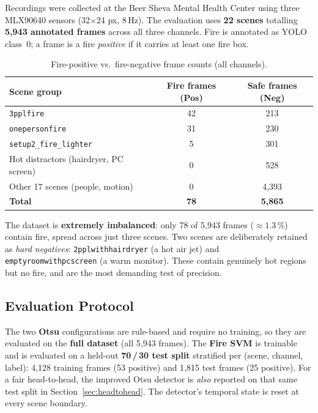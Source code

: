 \documentclass[11pt, a4paper]{article}
\begin{document}
Recordings were collected at the Beer Sheva Mental Health Center using three MLX90640
sensors (32$\times$24 px, 8\,Hz).  The evaluation uses \textbf{22 scenes} totalling
\textbf{5{,}943 annotated frames} across all three channels.  Fire is annotated as
YOLO class~0; a frame is a fire \emph{positive} if it carries at least one fire box.

\begin{table}[H]
\centering
\caption{Fire-positive vs.\ fire-negative frame counts (all channels).}
\renewcommand{\arraystretch}{1.3}
\begin{tabular}{lcc}
\toprule
\textbf{Scene group} & \textbf{Fire frames (Pos)} & \textbf{Safe frames (Neg)} \\
\midrule
\texttt{3pplfire}                 & 42 & 213 \\
\texttt{onepersonfire}            & 31 & 230 \\
\texttt{setup2\_fire\_lighter}    &  5 & 301 \\
\addlinespace
Hot distractors (hairdryer, PC screen) & 0 & 528 \\
Other 17 scenes (people, motion)       & 0 & 4{,}393 \\
\midrule
\textbf{Total} & \textbf{78} & \textbf{5{,}865} \\
\bottomrule
\end{tabular}
\label{tab:counts}
\end{table}

The dataset is \textbf{extremely imbalanced}: only 78 of 5{,}943 frames
($\approx 1.3\,\%$) contain fire, spread across just three scenes.  Two scenes are
deliberately retained as \emph{hard negatives}: \texttt{2pplwithhairdryer} (a hot air
jet) and \texttt{emptyroomwithpcscreen} (a warm monitor).  These contain genuinely hot
regions but no fire, and are the most demanding test of precision.

\subsection{Evaluation Protocol}

The two \textbf{Otsu} configurations are rule-based and require no training, so they
are evaluated on the \textbf{full dataset} (all 5{,}943 frames).  The \textbf{Fire SVM}
is trainable and is evaluated on a held-out \textbf{70\,/\,30 test split} stratified per
(scene, channel, label): 4{,}128 training frames (53 positive) and 1{,}815 test frames
(25 positive).  For a fair head-to-head, the improved Otsu detector is \emph{also}
reported on that same test split in Section~\ref{sec:headtohead}.  The detector's
temporal state is reset at every scene boundary.
\end{document}
